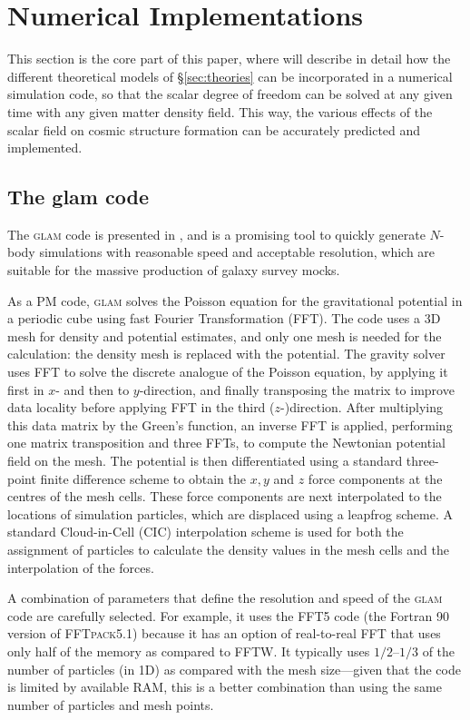 
\section{Numerical Implementations}
\label{sect:numerics}

This section is the core part of this paper, where will describe in detail how the different theoretical models of \S\ref{sec:theories} can be incorporated in a numerical simulation code, so that the scalar degree of freedom can be solved at any given time with any given matter density field. This way, the various effects of the scalar field on cosmic structure formation can be accurately predicted and implemented. 

\subsection{The {\sc glam} code}
\label{subsect:glam}

The \textsc{glam} code is presented in \cite{Klypin:2017iwu}, and is a promising tool to quickly generate $N$-body simulations with reasonable speed and acceptable resolution, which are suitable for the massive production of galaxy survey mocks. 


As a PM code, \textsc{glam} solves the Poisson equation for the gravitational potential in a periodic cube using fast Fourier Transformation (FFT). The code uses a 3D mesh for density and potential estimates, and only one mesh is needed for the calculation: the density mesh is replaced with the potential. The gravity solver uses FFT to solve the discrete analogue of the Poisson equation, by applying it first in $x$- and then to $y$-direction, and finally transposing the matrix to improve data locality before applying FFT in the third ($z$-)direction. After multiplying this data matrix by the Green's function, an inverse FFT is applied, performing one matrix transposition and three FFTs, to compute the Newtonian potential field on the mesh. The potential is then differentiated using a standard three-point finite difference scheme to obtain the $x,y$ and $z$ force components at the centres of the mesh cells. These force components are next interpolated to the locations of simulation particles, which are displaced using a leapfrog scheme. A standard Cloud-in-Cell (CIC) interpolation scheme is used for both the assignment of particles to calculate the density values in the mesh cells and the interpolation of the forces.  

A combination of parameters that define the resolution and speed of the \textsc{glam} code are carefully selected. For example, it uses the \textsc{FFT}5 code (the Fortran 90 version of \textsc{FFTpack}5.1) because it has an option of real-to-real FFT that uses only half of the memory as compared to \textsc{FFTW}. It typically uses $1/2$--$1/3$ of  the number of particles (in 1D) as compared with the mesh size---given that the code is limited by available RAM, this is a better combination than using the same number of particles and mesh points.

